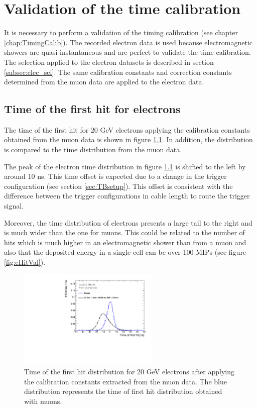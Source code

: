 \chapter{Validation of the time calibration}
\label{chap:TimingValidation}

It is necessary to perform a validation of the timing calibration (see chapter \ref{chap:TimingCalib}). The recorded electron data is used because electromagnetic showers are quasi-instantaneous and are perfect to validate the time calibration. The selection applied to the electron datasets is described in section \ref{subsec:elec_sel}. The same calibration constants and correction constants determined from the muon data are applied to the electron data.

\section{Time of the first hit for electrons}

The time of the first hit for 20 GeV electrons applying the calibration constants obtained from the muon data is shown in figure \ref{fig:Timing_electrons}. In addition, the distribution is compared to the time distribution from the muon data.

The peak of the electron time distribution in figure \ref{fig:Timing_electrons} is shifted to the left by around 10 ns. This time offset is expected due to a change in the trigger configuration (see section \ref{sec:TBsetup}). This offset is consistent with the difference between the trigger configurations in cable length to route the trigger signal.

Moreover, the time distribution of electrons presents a large tail to the right and is much wider than the one for muons. This could be related to the number of hits which is much higher in an electromagnetic shower than from a muon and also that the deposited energy in a single cell can be over 100 MIPs (see figure \ref{fig:eHitVal}).

\begin{figure}[htbp!]
	\centering
	\includegraphics[width=0.6\textwidth]{../Thesis_Plots/Timing/Electrons/Plots/Timing_AllLayers_AfterMuons.pdf}
	\caption{Time of the first hit distribution for 20 GeV electrons after applying the calibration constants extracted from the muon data. The blue distribution represents the time of first hit distribution obtained with muons.}
	\label{fig:Timing_electrons}
\end{figure}

